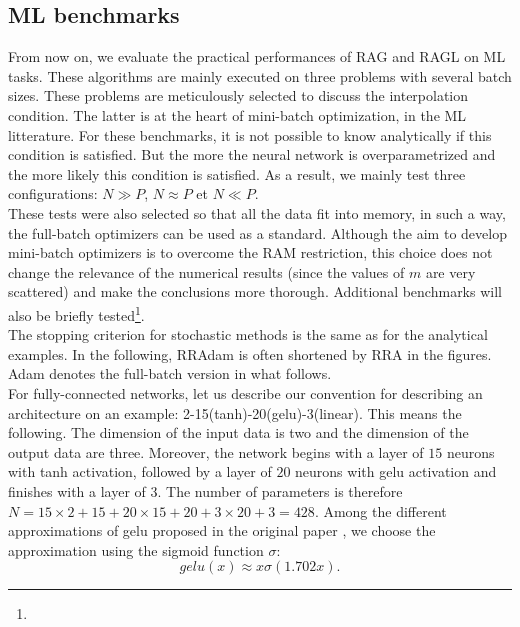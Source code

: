 \subsection{ML benchmarks}
\label{ML_benchs}

From now on, we evaluate the practical performances of RAG and RAGL on ML tasks. These algorithms are mainly executed on three problems with several batch sizes. These problems are
meticulously selected to discuss the interpolation condition. The latter is at the heart of mini-batch optimization, in the ML litterature. For these benchmarks, it is not possible
to know analytically if this condition is satisfied. But the more the neural network is overparametrized and the more likely this condition is satisfied. As a result, we mainly test three configurations: $N\gg P$, $N\approx P$ et $N\ll P$. \\
These tests were also selected so that all the data fit into memory, in such a way, the full-batch optimizers can be used as a standard. Although the aim to develop mini-batch
optimizers is to overcome the RAM restriction, this choice does not change the relevance of the numerical results (since the values of $m$ are very scattered) and make the
conclusions more thorough. Additional benchmarks will also be briefly tested\footnote{}.\\
The stopping criterion for stochastic methods is the same as for the analytical examples. In the following, RRAdam is often shortened by RRA in the figures. Adam denotes the full-batch version in what follows. \\
For fully-connected networks, let us describe our convention for describing an architecture on an example: 2-15(tanh)-20(gelu)-3(linear). This means the following. The dimension of the input data is two and the dimension of the output data are three. Moreover, the network begins with a layer of $15$ neurons with tanh activation, followed by a layer of $20$ neurons with gelu activation \cite{gelu} and finishes with a layer of $3$. The number of parameters is therefore $N=15\times 2 + 15 + 20\times 15 + 20 + 3\times 20 + 3 = 428$.
Among the different approximations of gelu proposed in the original paper \cite{gelu}, we choose the approximation using the sigmoid function $\sigma$:
\begin{equation*}
	gelu(x) \approx x\sigma(1.702x).
\end{equation*}
